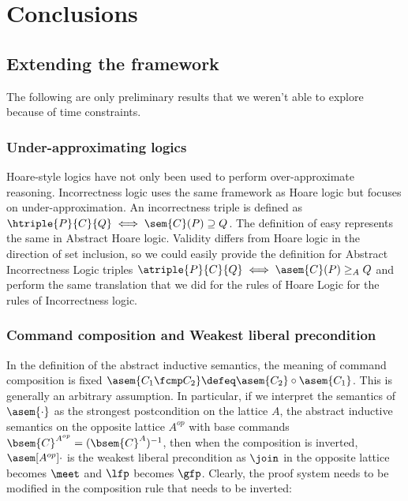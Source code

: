 \chapter{Conclusions}

\section{Extending the framework}
The following are only preliminary results that we weren't able to explore
because of time constraints.

\subsection{Under-approximating logics}
Hoare-style logics have not only been used to perform over-approximate
reasoning. Incorrectness logic \cite{OHearn19} uses the same framework as Hoare
logic but focuses on under-approximation. An incorrectness triple is defined as
$\htriple{P}{C}{Q} \iff \sem{C}(P) \supseteq Q$. The definition of easy
represents the same in Abstract Hoare logic. Validity differs from Hoare logic
in the direction of set inclusion, so we could easily provide the definition
for Abstract Incorrectness Logic triples $\atriple{P}{C}{Q} \iff \asem{C}(P)
\geq_A Q$ and perform the same translation that we did for the rules of Hoare
Logic for the rules of Incorrectness logic.

\subsection{Command composition and Weakest liberal precondition}
In the definition of the abstract inductive semantics, the meaning of command
composition is fixed $\asem{C_1 \fcmp C_2} \defeq \asem{C_2} \circ \asem{C_1}$.
This is generally an arbitrary assumption. In particular, if we interpret the
semantics of $\asem{\cdot}$ as the strongest postcondition on the lattice $A$,
the abstract inductive semantics on the opposite lattice $A^{op}$ with base
commands $\bsem{C}^{A^{op}} = (\bsem{C}^A)^{-1}$, then when the composition is
inverted, $\asem[A^{op}]{\cdot}$ is the weakest liberal precondition as $\join$
in the opposite lattice becomes $\meet$ and $\lfp$ becomes $\gfp$. Clearly, the
proof system needs to be modified in the composition rule that needs to be
inverted:

\begin{prooftree}
\end{prooftree}

